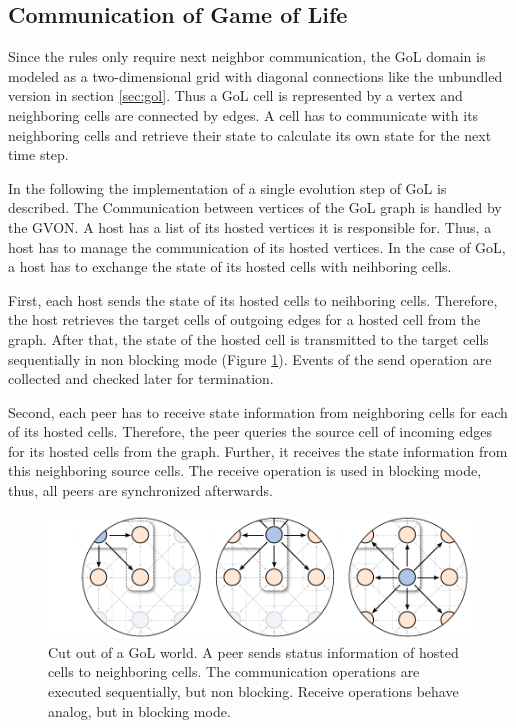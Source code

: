 \subsection{Communication of Game of Life}
\label{sec:gol_imp}
Since the rules only require next neighbor communication, the GoL
domain is modeled as a two-dimensional grid with diagonal connections
like the unbundled version in section \ref{sec:gol}. Thus a GoL cell
is represented by a vertex and neighboring cells are connected by
edges. A cell has to communicate with its neighboring cells and
retrieve their state to calculate its own state for the next time
step.

In the following the implementation of a single evolution step of GoL
is described. The Communication between vertices of the GoL graph
is handled by the GVON. A host has a list of its hosted vertices it is
responsible for. Thus, a host has to manage the communication of its
hosted vertices. In the case of GoL, a host has to exchange the state
of its hosted cells with neihboring cells.

First, each host sends the state of its hosted cells to neihboring
cells. Therefore, the host retrieves the target cells of outgoing
edges for a hosted cell from the graph. After that, the state of the
hosted cell is transmitted to the target cells sequentially in non
blocking mode (Figure \ref{fig:gol_communication}). Events of the send
operation are collected and checked later for termination.

Second, each peer has to receive state information from neighboring
cells for each of its hosted cells. Therefore, the peer queries the
source cell of incoming edges for its hosted cells from the
graph. Further, it receives the state information from this
neighboring source cells.  The receive operation is used in blocking
mode, thus, all peers are synchronized afterwards.

\begin{figure}[H]
  \centering
  \includegraphics[width=\textwidth]{graphics/40_gol_communication}
  \caption{Cut out of a GoL world. A peer sends status information of
    hosted cells to neighboring cells. The communication operations
    are executed sequentially, but non blocking. Receive operations
    behave analog, but in blocking mode.}
  \label{fig:gol_communication}
\end{figure}

